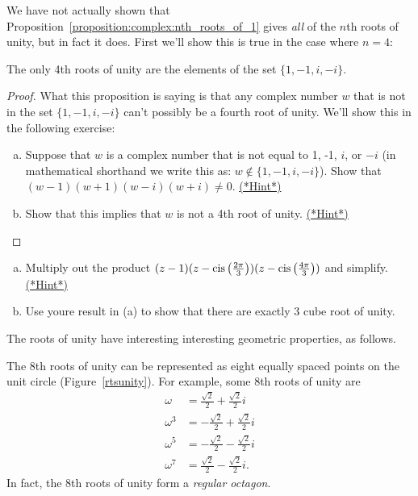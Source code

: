 {We have not actually shown that Proposition~\ref{proposition:complex:nth_roots_of_1} gives \emph{all} of the $n$th roots of unity, but in fact it does. First we'll  show this is true in the case where $n=4$:

\begin{prop}\label{proposition:complex:4throot}
 The only 4th roots of unity are the elements of the set $\{1,-1,i,-i\}$.
\end{prop}

\begin{proof}
What this proposition is saying is that any complex number $w$ that is not in the set $\{1,-1,i,-i\}$ can't possibly be a fourth root of unity. We'll show  this in the following exercise: 

\begin{exercise}\label{exercise:complex:50}

\begin{enumerate}[(a)]
\item
Suppose that $w$ is a complex number that is not equal to 1, -1, $i$, or $-i$ (in mathematical shorthand we write this as: $w \notin \{1,-1,i,-i \}$). Show that $(w-1)(w+1)(w-i)(w+i) \neq 0$.
\hyperref[sec:complex:hints]{(*Hint*)}
\item
Show that this implies that $w$ is not a 4th root of unity.
\hyperref[sec:complex:hints]{(*Hint*)}
\end{enumerate}
\end{exercise}
\end{proof}

\begin{exercise}\label{exercise:complex:51}
\begin{enumerate}[(a)]
\item
Multiply out the product $(z - 1)(z - \operatorname{cis}\left(\frac{2\pi}{3}\right))(z - \operatorname{cis}\left(\frac{4\pi}{3}\right))$ and simplify.
\hyperref[sec:complex:hints]{(*Hint*)}
\item
Use youre result in (a) to show that there are exactly 3 cube root of unity. 
\end{enumerate}
\end{exercise}

The roots of unity have interesting interesting geometric properties, as follows.

\begin{example}\label{example:complex:rootsunity} The 8th roots of unity can be represented
as eight equally spaced points on the unit circle (Figure~\ref{rtsunity}).
For example, some 8th roots of unity are \begin{align*}
\omega & =\frac{\sqrt{2}}{2}+\frac{\sqrt{2}}{2}i\\
\omega^{3} & =-\frac{\sqrt{2}}{2}+\frac{\sqrt{2}}{2}i\\
\omega^{5} & =-\frac{\sqrt{2}}{2}-\frac{\sqrt{2}}{2}i\\
\omega^{7} & =\frac{\sqrt{2}}{2}-\frac{\sqrt{2}}{2}i.\end{align*}
In fact, the 8th roots of unity form a \emph{regular octagon}.
 \end{example}

}
